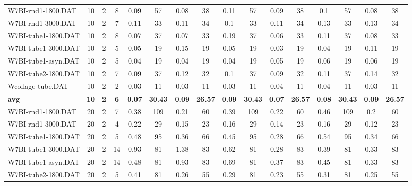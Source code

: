 \begin{sidewaystable}[!ht]
{\begin{tabular}{lccccccccccccccc}
W7BI-rnd1-1800.DAT & 10 & 2 & 8 & 0.09 & 57 &  \textcolor{blue2}{0.08} & 38 & 0.11 & 57 & 0.09 & 38 & 0.1 & 57 &  \textcolor{blue2}{0.08} & 38 \\
W7BI-rnd1-3000.DAT & 10 & 2 & 7 & 0.11 & 33 & 0.11 & 34 &  \textcolor{blue2}{0.1} & 33 & 0.11 & 34 & 0.13 & 33 & 0.13 & 34 \\
W7BI-tube1-1800.DAT & 10 & 2 & 8 & 0.07 & 37 & 0.07 & 33 & 0.19 & 37 &  \textcolor{blue2}{0.06} & 33 & 0.11 & 37 & 0.08 & 33 \\
W7BI-tube1-3000.DAT & 10 & 2 & 5 & 0.05 & 19 & 0.15 & 19 & 0.05 & 19 &  \textcolor{blue2}{0.03} & 19 & 0.04 & 19 & 0.11 & 19 \\
W7BI-tube1-asyn.DAT & 10 & 2 & 5 &  \textcolor{blue2}{0.04} & 19 &  \textcolor{blue2}{0.04} & 19 &  \textcolor{blue2}{0.04} & 19 & 0.05 & 19 & 0.06 & 19 & 0.06 & 19 \\
W7BI-tube2-1800.DAT & 10 & 2 & 7 &  \textcolor{blue2}{0.09} & 37 & 0.12 & 32 & 0.1 & 37 &  \textcolor{blue2}{0.09} & 32 & 0.11 & 37 & 0.14 & 32 \\
Wcollage-tube.DAT & 10 & 2 & 2 &  \textcolor{blue2}{0.03} & 11 &  \textcolor{blue2}{0.03} & 11 &  \textcolor{blue2}{0.03} & 11 & 0.04 & 11 & 0.04 & 11 &  \textcolor{blue2}{0.03} & 11 \\
\cline{1-16} \textbf{avg} & \textbf{10} & \textbf{2} & \textbf{6} & \textbf{0.07} & \textbf{30.43} & \textbf{0.09} & \textbf{26.57} & \textbf{0.09} & \textbf{30.43} & \textbf{0.07} & \textbf{26.57} & \textbf{0.08} & \textbf{30.43} & \textbf{0.09} & \textbf{26.57} \\ \cline{1-16}
W7BI-rnd1-1800.DAT & 20 & 2 & 7 & 0.38 & 109 & 0.21 & 60 & 0.39 & 109 & 0.22 & 60 & 0.46 & 109 &  \textcolor{blue2}{0.2} & 60 \\
W7BI-rnd1-3000.DAT & 20 & 2 & 4 & 0.22 & 29 & 0.15 & 23 & 0.16 & 29 & 0.14 & 23 & 0.16 & 29 &  \textcolor{blue2}{0.12} & 23 \\
W7BI-tube1-1800.DAT & 20 & 2 & 5 & 0.48 & 95 & 0.36 & 66 & 0.45 & 95 &  \textcolor{blue2}{0.28} & 66 & 0.54 & 95 & 0.34 & 66 \\
W7BI-tube1-3000.DAT & 20 & 2 & 14 & 0.93 & 81 & 1.38 & 83 & 0.62 & 81 &  \textcolor{blue2}{0.28} & 83 & 0.39 & 81 & 0.33 & 83 \\
W7BI-tube1-asyn.DAT & 20 & 2 & 14 & 0.48 & 81 & 0.93 & 83 & 0.69 & 81 & 0.37 & 83 & 0.45 & 81 &  \textcolor{blue2}{0.33} & 83 \\
W7BI-tube2-1800.DAT & 20 & 2 & 5 & 0.41 & 81 & 0.26 & 55 & 0.29 & 81 &  \textcolor{blue2}{0.23} & 55 & 0.31 & 81 & 0.25 & 55 \\

\end{tabular}}
\end{sidewaystable}
